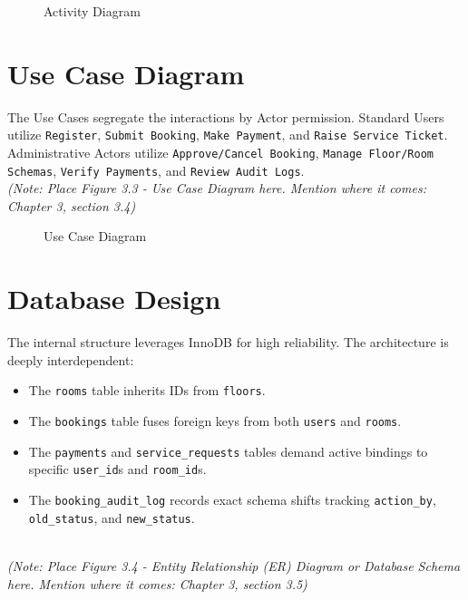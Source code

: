 \documentclass[12pt,a4paper]{report}
\begin{document}
\begin{figure}[H]
    \centering
    \vspace{5cm}
    \caption{Activity Diagram}
    \label{fig:activity}
\end{figure}

\section{Use Case Diagram}
The Use Cases segregate the interactions by Actor permission. Standard Users utilize \texttt{Register}, \texttt{Submit Booking}, \texttt{Make Payment}, and \texttt{Raise Service Ticket}. Administrative Actors utilize \texttt{Approve/Cancel Booking}, \texttt{Manage Floor/Room Schemas}, \texttt{Verify Payments}, and \texttt{Review Audit Logs}.
\vspace{0.5cm}\\
\textit{(Note: Place Figure 3.3 - Use Case Diagram here. Mention where it comes: Chapter 3, section 3.4)}

\begin{figure}[H]
    \centering
    \vspace{5cm}
    \caption{Use Case Diagram}
    \label{fig:usecase}
\end{figure}

\section{Database Design}
The internal structure leverages InnoDB for high reliability. The architecture is deeply interdependent: 
\begin{itemize}
    \item The \texttt{rooms} table inherits IDs from \texttt{floors}. 
    \item The \texttt{bookings} table fuses foreign keys from both \texttt{users} and \texttt{rooms}. 
    \item The \texttt{payments} and \texttt{service\_requests} tables demand active bindings to specific \texttt{user\_id}s and \texttt{room\_id}s. 
    \item The \texttt{booking\_audit\_log} records exact schema shifts tracking \texttt{action\_by}, \texttt{old\_status}, and \texttt{new\_status}.
\end{itemize}
\vspace{0.5cm}\\
\textit{(Note: Place Figure 3.4 - Entity Relationship (ER) Diagram or Database Schema here. Mention where it comes: Chapter 3, section 3.5)}
\end{document}
